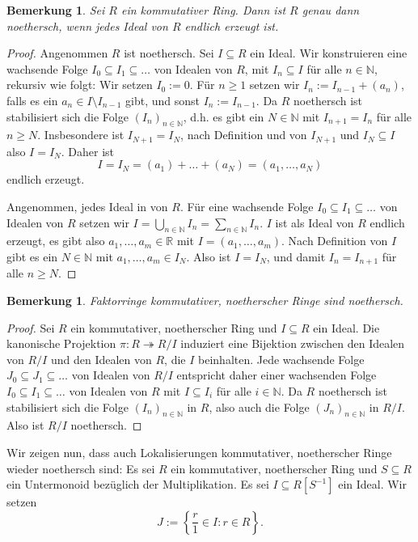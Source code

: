 \documentclass[a4paper,10pt]{article}
\newcounter{satze}
\newtheorem{bem}[satze]{Bemerkung}
\theoremstyle{definition}
\newcommand{\N}{\mathbb{N}}
\newcommand{\R}{\mathbb{R}}
\begin{document}
\begin{bem}\label{bem: def noethersch}
 Sei $R$ ein kommutativer Ring. Dann ist $R$ genau dann noethersch, wenn jedes Ideal von $R$ endlich erzeugt ist. 
\end{bem}
\begin{proof}
 Angenommen $R$ ist noethersch. Sei $I \subseteq R$ ein Ideal. Wir konstruieren eine wachsende Folge $I_0 \subseteq I_1 \subseteq \ldots$ von Idealen von $R$, mit $I_n \subseteq I$ für alle $n \in \N$, rekursiv wie folgt: Wir setzen $I_0 := 0$. Für $n \geq 1$ setzen wir $I_n := I_{n-1} + (a_n)$, falls es ein $a_n \in I \setminus I_{n-1}$ gibt, und sonst $I_n := I_{n-1}$. Da $R$ noethersch ist stabilisiert sich die Folge $(I_n)_{n \in \N}$, d.h. es gibt ein $N \in \N$ mit $I_{n+1} = I_n$ für alle $n \geq N$. Insbesondere ist $I_{N+1} = I_N$, nach Definition und von $I_{N+1}$ und $I_N \subseteq I$ also $I = I_N$. Daher ist
 \[
  I = I_N = (a_1) + \ldots + (a_N) = (a_1, \ldots, a_N)
 \]
 endlich erzeugt.
 
 Angenommen, jedes Ideal in von $R$. Für eine wachsende Folge $I_0 \subseteq I_1 \subseteq \ldots$ von Idealen von $R$ setzen wir $I = \bigcup_{n \in \N} I_n = \sum_{n \in \N} I_n$. $I$ ist als Ideal von $R$ endlich erzeugt, es gibt also $a_1, \ldots, a_m \in \R$ mit $I = (a_1, \ldots, a_m)$. Nach Definition von $I$ gibt es ein $N \in \N$ mit $a_1, \ldots, a_m \in I_N$. Also ist $I = I_N$, und damit $I_{n} = I_{n+1}$ für alle $n \geq N$.
\end{proof}


\begin{bem}\label{bem: faktorringe noethersch}
 Faktorringe kommutativer, noetherscher Ringe sind noethersch.
\end{bem}
\begin{proof}
 Sei $R$ ein kommutativer, noetherscher Ring und $I \subseteq R$ ein Ideal. Die kanonische Projektion $\pi : R \twoheadrightarrow R/I$ induziert eine Bijektion zwischen den Idealen von $R/I$ und den Idealen von $R$, die $I$ beinhalten. Jede wachsende Folge $J_0 \subseteq J_1 \subseteq \ldots$ von Idealen von $R/I$ entspricht daher einer wachsenden Folge $I_0 \subseteq I_1 \subseteq \ldots$ von Idealen von $R$ mit $I \subseteq I_i$ für alle $i \in \N$. Da $R$ noethersch ist stabilisiert sich die Folge $(I_n)_{n \in \N}$ in $R$, also auch die Folge $(J_n)_{n \in \N}$ in $R/I$. Also ist $R/I$ noethersch.
\end{proof}


Wir zeigen nun, dass auch Lokalisierungen kommutativer, noetherscher Ringe wieder noethersch sind: Es sei $R$ ein kommutativer, noetherscher Ring und $S \subseteq R$ ein Untermonoid bezüglich der Multiplikation. Es sei $I \subseteq R[S^{-1}]$ ein Ideal. Wir setzen
\[
 J := \left\{ \frac{r}{1} \in I : r \in R \right\}.
\]
\end{document}
